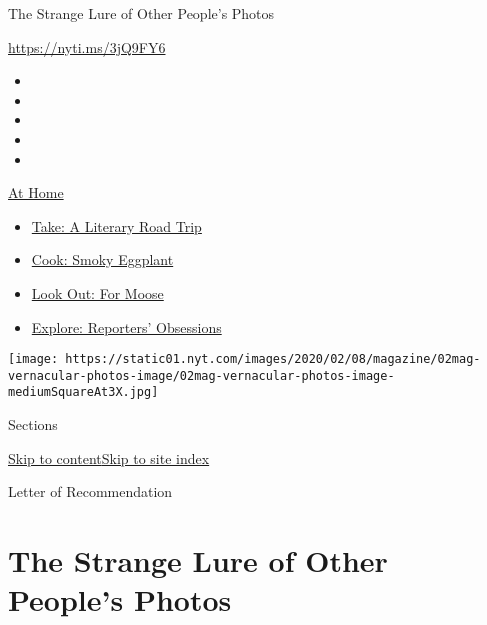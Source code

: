 The Strange Lure of Other People's Photos

\url{https://nyti.ms/3jQ9FY6}

\begin{itemize}
\item
\item
\item
\item
\item
\end{itemize}

\href{https://www.nytimes.com/spotlight/at-home?action=click\&pgtype=Article\&state=default\&region=TOP_BANNER\&context=at_home_menu}{At
Home}

\begin{itemize}
\tightlist
\item
  \href{https://www.nytimes.com/2020/07/28/books/time-for-a-literary-road-trip.html?action=click\&pgtype=Article\&state=default\&region=TOP_BANNER\&context=at_home_menu}{Take:
  A Literary Road Trip}
\item
  \href{https://www.nytimes.com/2020/07/29/magazine/bored-with-your-home-cooking-some-smoky-eggplant-will-fix-that.html?action=click\&pgtype=Article\&state=default\&region=TOP_BANNER\&context=at_home_menu}{Cook:
  Smoky Eggplant}
\item
  \href{https://www.nytimes.com/2020/07/27/travel/moose-michigan-isle-royale.html?action=click\&pgtype=Article\&state=default\&region=TOP_BANNER\&context=at_home_menu}{Look
  Out: For Moose}
\item
  \href{https://www.nytimes.com/interactive/2020/at-home/even-more-reporters-editors-diaries-lists-recommendations.html?action=click\&pgtype=Article\&state=default\&region=TOP_BANNER\&context=at_home_menu}{Explore:
  Reporters' Obsessions}
\end{itemize}

\texttt{[image: https://static01.nyt.com/images/2020/02/08/magazine/02mag-vernacular-photos-image/02mag-vernacular-photos-image-mediumSquareAt3X.jpg]}

Sections

\protect\hyperlink{site-content}{Skip to
content}\protect\hyperlink{site-index}{Skip to site index}

Letter of Recommendation

\hypertarget{the-strange-lure-of-other-peoples-photos}{%
\section{The Strange Lure of Other People's
Photos}\label{the-strange-lure-of-other-peoples-photos}}

